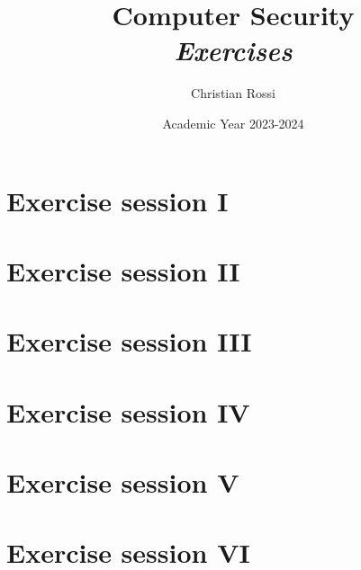 \documentclass[12pt, a4paper]{report}
\title{Computer Security \\ \textit{Exercises}}
\author{Christian Rossi}
\date{Academic Year 2023-2024}
\begin{document}
    \maketitle

    

    \cleardoublepage

    \tableofcontents

    \cleardoublepage

    \chapter{Exercise session I}
    
    
    
    
    

    \chapter{Exercise session II}
    
    

    \chapter{Exercise session III}
    
    

    \chapter{Exercise session IV}
    
    
    
    
    

    \chapter{Exercise session V}
    
    

    \chapter{Exercise session VI}
    
    
    
\end{document}
